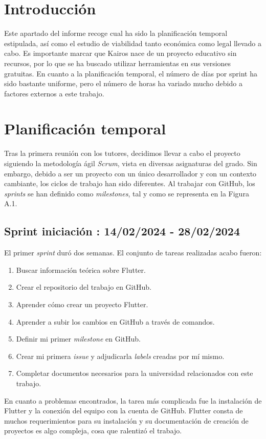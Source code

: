 
\section{Introducción}

	Este apartado del informe recoge cual ha sido la planificación temporal estipulada, así como el estudio de viabilidad tanto económica como legal llevado a cabo. Es importante marcar que Kairos nace de un proyecto educativo sin recursos, por lo que se ha buscado utilizar herramientas en sus versiones gratuitas. En cuanto a la planificación temporal, el número de días por sprint ha sido bastante uniforme, pero el número de horas ha variado mucho debido a factores externos a este trabajo.	

\section{Planificación temporal}

	Tras la primera reunión con los tutores, decidimos llevar a cabo el proyecto siguiendo la metodología ágil \emph{Scrum}, vista en diversas asignaturas del grado. Sin embargo, debido a ser un proyecto con un único desarrollador y con un contexto cambiante, los ciclos de trabajo han sido diferentes. Al trabajar con GitHub, los \emph{sprints} se han definido como \emph{milestones}, tal y como se representa en la Figura A.1.
	

\subsection{Sprint iniciación : 14/02/2024 - 28/02/2024}

	El primer \emph{sprint} duró dos semanas. El conjunto de tareas realizadas acabo fueron:
	\begin{enumerate}
		\item Buscar información teórica sobre Flutter.
		\item Crear el repositorio del trabajo en GitHub.
		\item Aprender cómo crear un proyecto Flutter.
		\item Aprender a subir los cambios en GitHub a través de comandos.
		\item Definir mi primer \emph{milestone} en GitHub.
		\item Crear mi primera \emph{issue} y adjudicarla \emph{labels} creadas por mí mismo.
		\item Completar documentos necesarios para la universidad relacionados con este trabajo.
	\end{enumerate}
	En cuanto a problemas encontrados, la tarea más complicada fue la instalación de Flutter y la conexión del equipo con la cuenta de GitHub. Flutter consta de muchos requerimientos para su instalación y su documentación de creación de proyectos es algo compleja, cosa que ralentizó el trabajo.
	
